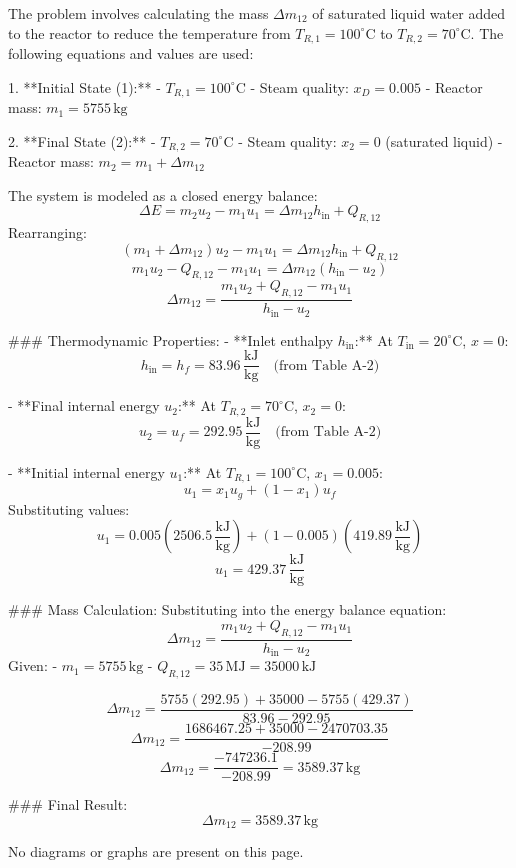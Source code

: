 The problem involves calculating the mass \( \Delta m_{12} \) of saturated liquid water added to the reactor to reduce the temperature from \( T_{R,1} = 100^\circ\text{C} \) to \( T_{R,2} = 70^\circ\text{C} \). The following equations and values are used:

1. **Initial State (1):**  
   - \( T_{R,1} = 100^\circ\text{C} \)  
   - Steam quality: \( x_D = 0.005 \)  
   - Reactor mass: \( m_1 = 5755 \, \text{kg} \)  

2. **Final State (2):**  
   - \( T_{R,2} = 70^\circ\text{C} \)  
   - Steam quality: \( x_2 = 0 \) (saturated liquid)  
   - Reactor mass: \( m_2 = m_1 + \Delta m_{12} \)  

The system is modeled as a closed energy balance:  
\[
\Delta E = m_2 u_2 - m_1 u_1 = \Delta m_{12} h_{\text{in}} + Q_{R,12}
\]  
Rearranging:  
\[
(m_1 + \Delta m_{12}) u_2 - m_1 u_1 = \Delta m_{12} h_{\text{in}} + Q_{R,12}
\]  
\[
m_1 u_2 - Q_{R,12} - m_1 u_1 = \Delta m_{12} (h_{\text{in}} - u_2)
\]  
\[
\Delta m_{12} = \frac{m_1 u_2 + Q_{R,12} - m_1 u_1}{h_{\text{in}} - u_2}
\]

### Thermodynamic Properties:
- **Inlet enthalpy \( h_{\text{in}} \):**  
  At \( T_{\text{in}} = 20^\circ\text{C} \), \( x = 0 \):  
  \[
  h_{\text{in}} = h_f = 83.96 \, \frac{\text{kJ}}{\text{kg}} \quad \text{(from Table A-2)}
  \]

- **Final internal energy \( u_2 \):**  
  At \( T_{R,2} = 70^\circ\text{C} \), \( x_2 = 0 \):  
  \[
  u_2 = u_f = 292.95 \, \frac{\text{kJ}}{\text{kg}} \quad \text{(from Table A-2)}
  \]

- **Initial internal energy \( u_1 \):**  
  At \( T_{R,1} = 100^\circ\text{C} \), \( x_1 = 0.005 \):  
  \[
  u_1 = x_1 u_g + (1 - x_1) u_f  
  \]  
  Substituting values:  
  \[
  u_1 = 0.005 (2506.5 \, \frac{\text{kJ}}{\text{kg}}) + (1 - 0.005)(419.89 \, \frac{\text{kJ}}{\text{kg}})  
  \]  
  \[
  u_1 = 429.37 \, \frac{\text{kJ}}{\text{kg}}
  \]

### Mass Calculation:
Substituting into the energy balance equation:  
\[
\Delta m_{12} = \frac{m_1 u_2 + Q_{R,12} - m_1 u_1}{h_{\text{in}} - u_2}
\]  
Given:  
- \( m_1 = 5755 \, \text{kg} \)  
- \( Q_{R,12} = 35 \, \text{MJ} = 35000 \, \text{kJ} \)  

\[
\Delta m_{12} = \frac{5755 (292.95) + 35000 - 5755 (429.37)}{83.96 - 292.95}
\]  
\[
\Delta m_{12} = \frac{1686467.25 + 35000 - 2470703.35}{-208.99}
\]  
\[
\Delta m_{12} = \frac{-747236.1}{-208.99} = 3589.37 \, \text{kg}
\]

### Final Result:
\[
\Delta m_{12} = 3589.37 \, \text{kg}
\]  

No diagrams or graphs are present on this page.